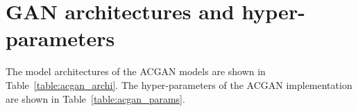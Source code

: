 \documentclass[twocolumn]{article}
\numberwithin{equation}{section}
\begin{document}






\section{GAN architectures and hyper-parameters}\label{appendix:acgan_setup}

The model architectures of the ACGAN models are shown in Table~\ref{table:acgan_archi}. 
The hyper-parameters of the ACGAN implementation are shown in Table~\ref{table:acgan_params}. 
\end{document}
